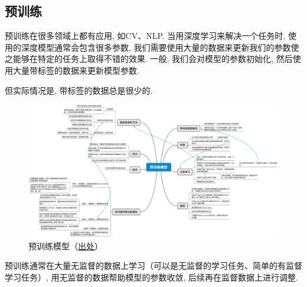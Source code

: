 \subsection{预训练}
预训练在很多领域上都有应用, 如CV、NLP. 当用深度学习来解决一个任务时, 使用的深度模型通常会包含很多参数, 我们需要使用大量的数据来更新我们的参数使之能够在特定的任务上取得不错的效果. 一般, 我们会对模型的参数初始化, 然后使用大量带标签的数据来更新模型参数. 

但实际情况是, 带标签的数据总是很少的. 

\begin{figure}[h]
	\centering
	\includegraphics[width=\textwidth]{pics/pre-train.jpg}
	\caption{预训练模型（\href{https://www.zhihu.com/question/327642286/answer/1215812016}{出处}）}
	\label{fig:pre-train}
\end{figure}
预训练通常在大量无监督的数据上学习（可以是无监督的学习任务、简单的有监督学习任务）, 用无监督的数据帮助模型的参数收敛, 后续再在监督数据上进行调整. 




